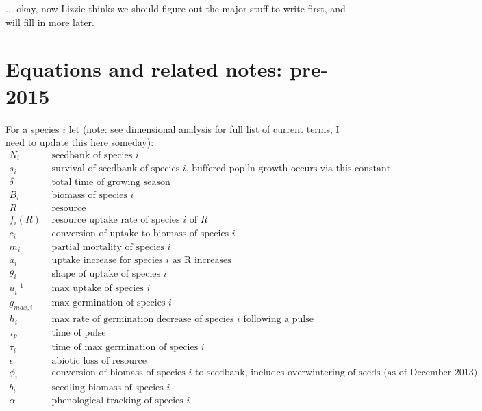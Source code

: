 \documentclass[11pt,a4paper,oneside]{article}
\begin{document}
... okay, now Lizzie thinks we should figure out the major stuff to write first, and will fill in more later.

\newpage
\section{Equations and related notes: pre-2015}

\noindent For a species \(i\) let (note: see dimensional analysis for full list of current terms, I need to update this here someday):
\begin{align*}
N_{i} & \text{   seedbank of species } i
\\
s_{i} & \text{   survival of seedbank of species } i \text{, buffered pop'ln
  growth occurs via this constant}
\\
\delta & \text{   total time of growing season}
\\
B_{i} &  \text{   biomass of species } i
\\
R &   \text{   resource}
\\
f_{i}(R) & \text{  resource uptake rate of species } i \text{ of } R
\\
c_{i} & \text{   conversion of uptake to biomass of species } i
\\
m_{i} & \text{   partial mortality of species } i
\\
a_{i} & \text{   uptake increase for species } i \text{ as R increases}
\\
\theta_{i} & \text{   shape of uptake of species } i
\\
u_{i}^{-1} & \text{   max uptake of species } i
\\
g_{max,i} & \text{   max germination of species } i
\\
h_{i} & \text{   max rate of germination decrease of species } i
\text{ following a pulse}
\\
\tau_{p} & \text{   time of pulse }
\\
\tau_{i} & \text{   time of max germination of species } i
\\
\epsilon & \text{   abiotic loss of resource}
\\
\phi_{i} & \text{   conversion of biomass of species } i \text{ to
  seedbank, includes overwintering of seeds (as of December 2013)}
\\
b_{i} & \text{   seedling biomass of species } i
\\
\alpha & \text{   phenological tracking of species  } i
\\
\end{align*}
\end{document}

